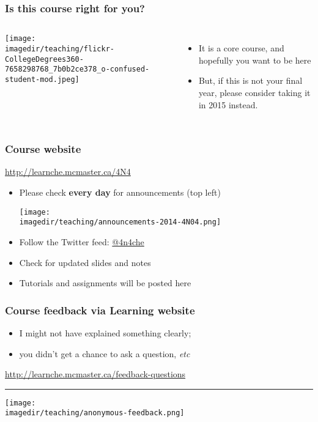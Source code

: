 \begin{frame}\frametitle{Is this course right for you?}
	
	\begin{columns}[c]
			\centerline{\texttt{[image: \\imagedir/teaching/flickr-CollegeDegrees360-7658298768\_7b0b2ce378\_o-confused-student-mod.jpeg]}}
			\begin{itemize}
				\item	It is a core course, and hopefully you want to be here
				\item	But, if this is not your final year, please consider taking it in 2015 instead.
			\end{itemize}
	\end{columns}
\end{frame}


\begin{frame}\frametitle{Course website}
	\begin{exampleblock}{}
		\centering
		\href{http://learnche.mcmaster.ca/4N4}{http://learnche.mcmaster.ca/4N4}
	\end{exampleblock}
	\begin{itemize}
		\item	Please check \textbf{every day} for announcements {\tiny (top left)}
		\begin{flushright}
			\texttt{[image: \\imagedir/teaching/announcements-2014-4N04.png]}
		\end{flushright}

		\vspace{-1cm}
		\item	Follow the Twitter feed: \href{https://twitter.com/4n4che}{@4n4che}
		\item	Check for updated slides and notes
		\item	Tutorials and assignments will be posted here
	\end{itemize}
\end{frame}

\begin{frame}\frametitle{Course feedback via Learning website}
	\begin{itemize}
		\item	I might not have explained something clearly;
		\item	you didn't get a chance to ask a question, \emph{etc}
	\end{itemize}
	\href{http://learnche.mcmaster.ca/feedback-questions}{http://learnche.mcmaster.ca/feedback-questions}
	\vspace{12pt}
	\hrule
	\begin{center}
		\texttt{[image: \\imagedir/teaching/anonymous-feedback.png]}
	\end{center}
\end{frame}

